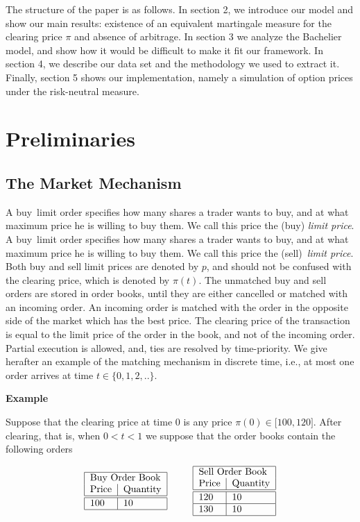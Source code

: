 \documentclass{article}
\begin{document}
The structure of the paper is as follows. In section 2, we introduce our
model and show our main results: existence of an equivalent martingale
measure for the clearing price $\pi $ and absence of arbitrage. In section 3
we analyze the Bachelier model, and show how it would be difficult to make
it fit our framework. In section 4, we describe our data set and the
methodology we used to extract it. Finally, section 5 shows our
implementation, namely a simulation of option prices under the risk-neutral
measure.

\section{Preliminaries}

\subsection{The Market Mechanism}

\noindent A buy\ limit order specifies how many shares a trader wants to
buy, and at what maximum price he is willing to buy them. We call this price
the (buy) \textit{limit price}. A buy\ limit order specifies how many shares
a trader wants to buy, and at what maximum price he is willing to buy them.
We call this price the (sell)\ \textit{limit price}. Both buy and sell limit
prices are denoted by $p$, and should not be confused with the clearing
price, which is denoted by $\pi (t)$. The unmatched buy and sell orders are
stored in order books, until they are either cancelled or matched with an
incoming order. An incoming order is matched with the order in the opposite
side of the market which has the best price. The clearing price of the
transaction is equal to the limit price of the order in the book, and not of
the incoming order. Partial execution is allowed, and, ties are resolved by
time-priority. We give herafter an example of the matching mechanism in
discrete time, i.e., at most one order arrives at time $t\in \{0,1,2,..\}.$

\textbf{Example}

Suppose that the clearing price at time $0$ is any price $\pi (0)\in \lbrack
100,120]$. After clearing, that is, when $0<t<1$ we suppose that the order
books contain the following orders

\begin{equation*}
\begin{tabular}{|l|l|}
\hline
\multicolumn{2}{|l|}{Buy Order Book} \\
Price & Quantity \\ \hline\hline
100 & 10 \\ \hline
\end{tabular}%
\text{ \ \ \ \ \ }%
\begin{tabular}{|l|l|}
\hline
\multicolumn{2}{|l|}{Sell Order Book} \\
Price & Quantity \\ \hline\hline
120 & 10 \\ \hline
130 & 10 \\ \hline
\end{tabular}%
\end{equation*}
\end{document}
